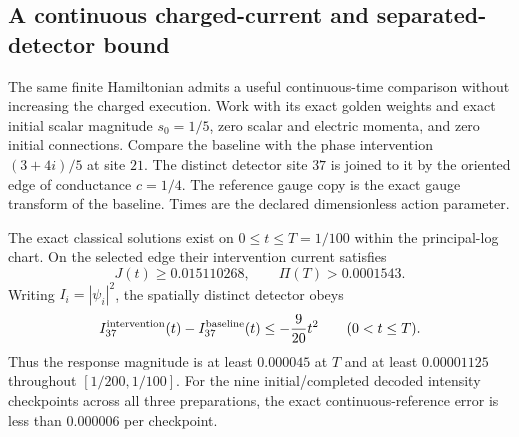 \subsection{A continuous charged-current and separated-detector bound}
\label{sec:cartan-scalar-readout}

The same finite Hamiltonian admits a useful continuous-time comparison
without increasing the charged execution. Work with its exact golden
weights and exact initial scalar magnitude $s_0=1/5$, zero scalar and
electric momenta, and zero initial connections. Compare the baseline with
the phase intervention $(3+4i)/5$ at site $21$. The distinct detector site
$37$ is joined to it by the oriented edge of conductance $c=1/4$.
The reference gauge copy is the exact gauge transform of the baseline.
Times are the declared dimensionless action parameter.

\begin{theorem}
\label{thm:cartan-scalar-readout}
The exact classical solutions exist on $0\leq t\leq T=1/100$ within
the principal-log chart. On the selected edge their intervention current
satisfies
\[
 J(t)\geq 0.015110268,
 \qquad \Pi(T)>0.0001543.
\]
Writing $I_i=|\psi_i|^2$, the spatially distinct detector obeys
\[
 I_{37}^{\rm intervention}(t)-I_{37}^{\rm baseline}(t)
 \leq-\frac9{20}t^2\qquad(0<t\leq T).
\]
Thus the response magnitude is at least $0.000045$ at $T$ and at least
$0.00001125$ throughout $[1/200,1/100]$. For the nine initial/completed
decoded intensity checkpoints across all three preparations, the exact
continuous-reference error is less than $0.000006$ per checkpoint.
\end{theorem}

